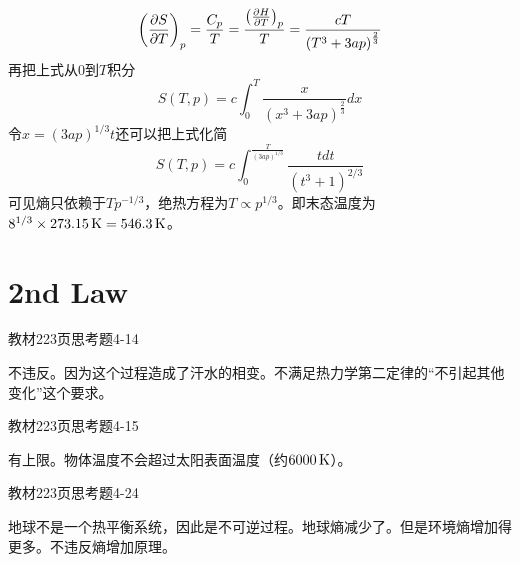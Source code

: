 \documentclass[CJK]{beamer}
\begin{document}
\begin{frame}
  \bch
  {\small
    $$ \left(\frac{\partial S}{\partial T}\right)_{p} = \frac{C_p}{T}= \frac{\left(\frac{\partial H}{\partial T}\right)_{p}}{T}  = \frac{cT}{\left(T^3 +3ap \right)^{\frac{2}{3}}} $$
    再把上式从$0$到$T$积分
    $$ S(T, p) = c \int_0^T  \frac{x}{\left(x^3 +3ap \right)^{\frac{2}{3}}} dx$$
    令$x = (3ap)^{1/3}t$还可以把上式化简
    $$S(T, p) = c \int_0^{\frac{T}{(3ap)^{1/3}}} \frac{tdt}{\left(t^3+1\right)^{2/3}} $$
    可见熵只依赖于$Tp^{-1/3}$，绝热方程为$T\propto p^{1/3}$。即末态温度为$8^{1/3}\times 273.15\,\mathrm{K} = 546.3\,\mathrm{K}$。
}
  \ech
\end{frame}



\section{2nd Law}

\begin{frame}
\end{frame}

\begin{frame}
  \bch
  教材223页思考题4-14
  \ech
\end{frame}


\begin{frame}
  \bch
  不违反。因为这个过程造成了汗水的相变。不满足热力学第二定律的“不引起其他变化”这个要求。
  \ech
\end{frame}


\begin{frame}
  \bch
  教材223页思考题4-15
  \ech
\end{frame}


\begin{frame}
  \bch
  有上限。物体温度不会超过太阳表面温度（约$6000\,\mathrm{K}$）。
  \ech
\end{frame}

\begin{frame}
  \bch
  教材223页思考题4-24
  \ech
\end{frame}


\begin{frame}
  \bch
  地球不是一个热平衡系统，因此是不可逆过程。地球熵减少了。但是环境熵增加得更多。不违反熵增加原理。
  \ech
\end{frame}
\end{document}
